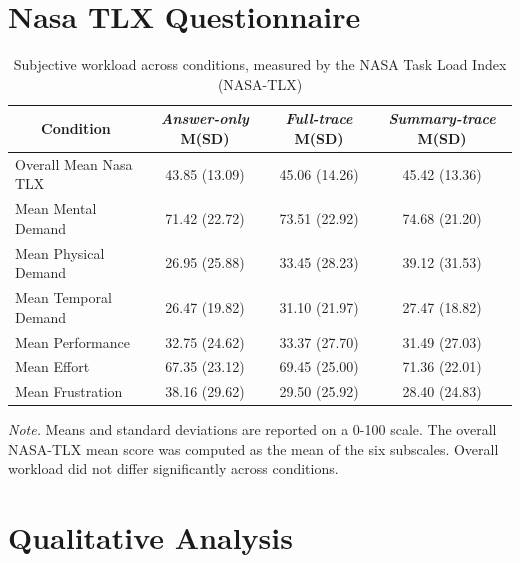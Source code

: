 \documentclass[manuscript,review,anonymous]{acmart}
\begin{document}
\section{Nasa TLX Questionnaire}
\begin{table}[H]
\centering
\caption{Subjective workload across conditions, measured by the NASA Task Load Index (NASA-TLX)}
\begin{tabular}{lccc}
\hline
\multicolumn{1}{c}{Condition} & \textit{Answer-only} M(SD)    & \textit{Full-trace} M(SD)      & \textit{Summary-trace}   M(SD)    \\ \hline
Overall Mean Nasa TLX                      & 43.85 (13.09) & 45.06 (14.26) & 45.42 (13.36) \\
Mean Mental Demand            & 71.42 (22.72) & 73.51 (22.92) & 74.68 (21.20) \\
Mean Physical Demand          & 26.95 (25.88) & 33.45 (28.23) & 39.12 (31.53) \\
Mean Temporal Demand          & 26.47 (19.82) & 31.10 (21.97) & 27.47 (18.82) \\
Mean Performance              & 32.75 (24.62) & 33.37 (27.70) & 31.49 (27.03) \\
Mean Effort                   & 67.35 (23.12) & 69.45 (25.00) & 71.36 (22.01)  \\
Mean Frustration              & 38.16 (29.62) & 29.50 (25.92) & 28.40 (24.83)   \\
\hline
\end{tabular}
\label{tab:nasa}

\raggedright \small \textit{Note.} Means and standard deviations are reported on a 0-100 scale. The overall NASA-TLX mean score was computed as the mean of the six subscales. Overall workload did not differ significantly across conditions.
\end{table}
\section{Qualitative Analysis}
\end{document}
